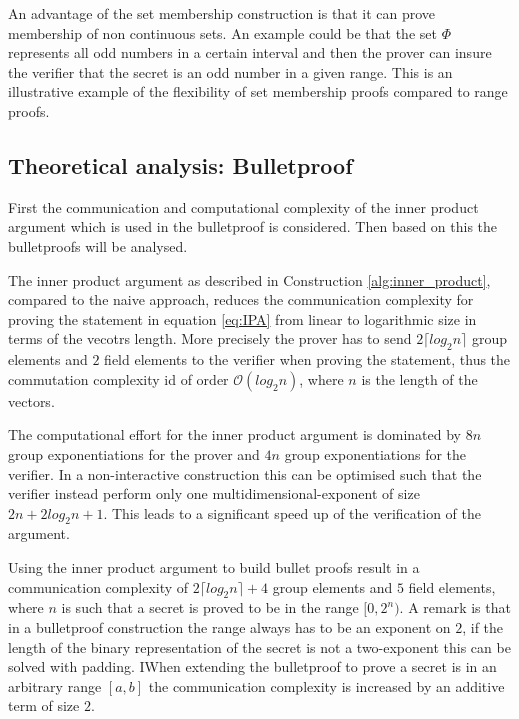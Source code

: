 An advantage of the set membership construction is that it can prove membership of non continuous sets. An example could be that the set $\Phi$ represents all odd numbers in a certain interval and then the prover can insure the verifier that the secret is an odd number in a given range. This is an illustrative example of the flexibility of set membership proofs compared to range proofs.

\subsection{Theoretical analysis: Bulletproof}
First the communication and computational complexity of the inner product argument which is used in the bulletproof is considered. Then based on this the bulletproofs will be analysed.

The inner product argument as described in Construction \ref{alg:inner_product}, compared to the naive approach, reduces the communication complexity for proving the statement in equation \eqref{eq:IPA} from linear to logarithmic size in terms of the vecotrs length.  More precisely the prover has to send $2\lceil log_2 n \rceil$ group elements and $2$ field elements to the verifier when proving the statement, thus the commutation complexity id of order $\mathcal{O}(log_2 n)$, where $n$ is the length of the vectors. 

The computational effort for the inner product argument is dominated by $8n$ group exponentiations for the prover and  $4n$ group exponentiations for the  verifier. In a non-interactive construction this can be optimised such that the verifier instead perform only one multidimensional-exponent of size $2n+ 2log_2n +1$. This leads to a significant speed up of the verification of the argument.     

Using the inner product argument to build bullet proofs result in a communication complexity of $2\lceil log_2 n \rceil +4$ group elements and $5$ field elements, where $n$ is such that a secret is proved to be in the range $[0,2^n)$.  A remark is that in a bulletproof construction the range always has to be an exponent on $2$, if the length of the binary representation of the secret is not a two-exponent this can be solved with padding. IWhen extending the bulletproof to prove a secret is in an arbitrary range $[a,b]$ the communication complexity is increased by an additive term of size $2$.  

